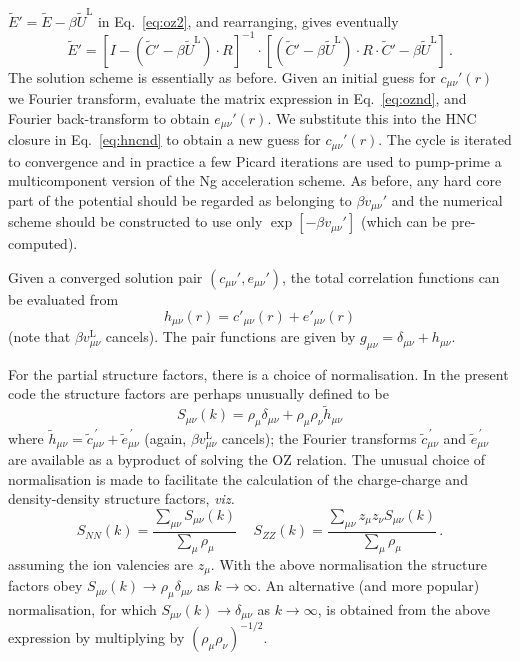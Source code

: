 \documentclass[12pt,a4paper]{article}
\newcommand{\latin}[1]{\emph{#1}}
\newcommand{\viz}{\latin{viz.}}
\newcommand{\lr}{^{\mathrm{L}}}
\newcommand{\myprime}{^{{}\,\prime}}
\newcommand{\Eqref}[1]{Eq.~\eqref{#1}}
\begin{document}
${\tilde E}'={\tilde E}-\beta{\tilde U}\lr$ in \Eqref{eq:oz2}, and
rearranging, gives eventually
%
\begin{equation}
{\tilde E}'=[I-({\tilde C}'-\beta{\tilde U}\lr)\cdot R]^{-1}\cdot
[({\tilde C}'-\beta{\tilde U}\lr)\cdot R\cdot {\tilde C}'-\beta{\tilde
    U}\lr]\,.
\label{eq:oznd}
\end{equation}
%
The solution scheme is essentially as before.  Given an initial guess
for $c_{\mu\nu}'(r)$ we Fourier transform, evaluate the matrix
expression in \Eqref{eq:oznd}, and Fourier back-transform to obtain
$e_{\mu\nu}'(r)$.  We substitute this into the HNC closure in
\Eqref{eq:hncnd} to obtain a new guess for $c_{\mu\nu}'(r)$.  The
cycle is iterated to convergence and in practice a few Picard
iterations are used to pump-prime a multicomponent version of the Ng
acceleration scheme.  As before, any hard core part of the potential
should be regarded as belonging to $\beta v_{\mu\nu}'$ and the
numerical scheme should be constructed to use only $\exp[-\beta
  v_{\mu\nu}']$ (which can be pre-computed).

Given a converged solution pair $(c_{\mu\nu}', e_{\mu\nu}')$, the
total correlation functions can be evaluated from
%
\begin{equation}
h_{\mu\nu}(r) = c'_{\mu\nu}(r) +  e'_{\mu\nu}(r)\label{eq:hrs}
\end{equation}
%
(note that $\beta v_{\mu\nu}\lr$ cancels).  The pair functions are
given by $g_{\mu\nu}=\delta_{\mu\nu}+h_{\mu\nu}$.

For the partial structure factors, there is a choice of normalisation.
In the present code the structure factors are perhaps unusually
defined to be
%
\begin{equation}
S_{\mu\nu}(k) = \rho_\mu\delta_{\mu\nu} + \rho_\mu\rho_\nu{\tilde
  h}_{\mu\nu}
\label{eq:skdef}
\end{equation}
%
where ${\tilde h}_{\mu\nu}={\tilde c}_{\mu\nu}\myprime + {\tilde
  e}_{\mu\nu}\myprime$ (again, $\beta v_{\mu\nu}\lr$ cancels); the
Fourier transforms ${\tilde c}_{\mu\nu}\myprime$ and ${\tilde
  e}_{\mu\nu}\myprime$ are available as a byproduct of solving the OZ
relation.  The unusual choice of normalisation is made to facilitate
the calculation of the charge-charge and density-density structure
factors, \viz\
%
\begin{equation}
  S_{NN}(k) = \frac{\sum_{\mu\nu}S_{\mu\nu}(k)}{\sum_\mu\rho_\mu}\,\quad
  S_{ZZ}(k) = \frac{\sum_{\mu\nu}z_\mu z_\nu S_{\mu\nu}(k)}{\sum_\mu\rho_\mu}\,.
  \label{eq:snnszz}
\end{equation}
%
assuming the ion valencies are $z_\mu$.
With the above normalisation the structure factors obey
$S_{\mu\nu}(k)\to\rho_\mu\delta_{\mu\nu}$ as $k\to\infty$.  An
alternative (and more popular) normalisation, for which
$S_{\mu\nu}(k)\to\delta_{\mu\nu}$ as $k\to\infty$, is obtained from
the above expression by multiplying by $({\rho_\mu\rho_\nu})^{-1/2}$.
\end{document}

